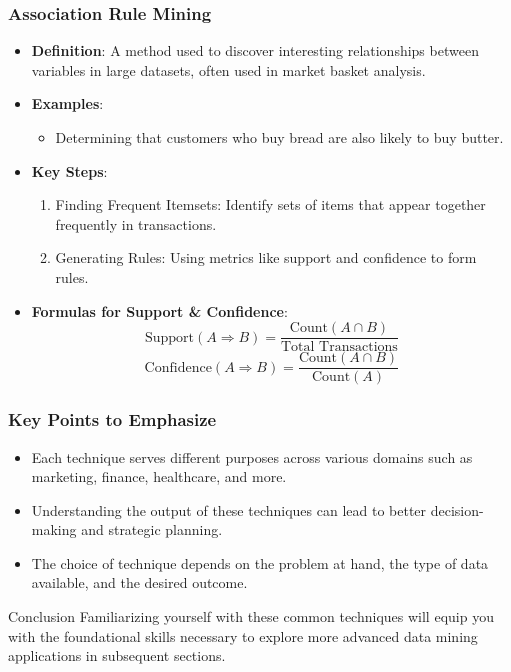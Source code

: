 \documentclass[aspectratio=169]{beamer}
\begin{document}
\begin{frame}[fragile]
    \frametitle{Association Rule Mining}
    \begin{itemize}
        \item \textbf{Definition}: A method used to discover interesting relationships between variables in large datasets, often used in market basket analysis.
        \item \textbf{Examples}:
            \begin{itemize}
                \item Determining that customers who buy bread are also likely to buy butter.
            \end{itemize}
        \item \textbf{Key Steps}:
            \begin{enumerate}
                \item Finding Frequent Itemsets: Identify sets of items that appear together frequently in transactions.
                \item Generating Rules: Using metrics like support and confidence to form rules.
            \end{enumerate}
        \item \textbf{Formulas for Support \& Confidence}:
        \begin{equation}
        \text{Support}(A \Rightarrow B) = \frac{\text{Count}(A \cap B)}{\text{Total Transactions}}
        \end{equation}
        \begin{equation}
        \text{Confidence}(A \Rightarrow B) = \frac{\text{Count}(A \cap B)}{\text{Count}(A)}
        \end{equation}
    \end{itemize}
\end{frame}

\begin{frame}[fragile]
    \frametitle{Key Points to Emphasize}
    \begin{itemize}
        \item Each technique serves different purposes across various domains such as marketing, finance, healthcare, and more.
        \item Understanding the output of these techniques can lead to better decision-making and strategic planning.
        \item The choice of technique depends on the problem at hand, the type of data available, and the desired outcome.
    \end{itemize}
    \begin{block}{Conclusion}
        Familiarizing yourself with these common techniques will equip you with the foundational skills necessary to explore more advanced data mining applications in subsequent sections.
    \end{block}
\end{frame}
\end{document}
